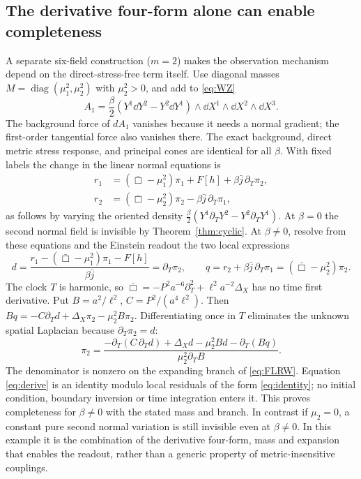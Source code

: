 \subsection{The derivative four-form alone can enable completeness}
A separate six-field construction (\(m=2\)) makes the observation mechanism depend on the direct-stress-free term itself. Use diagonal masses \(M=\operatorname{diag}(\mu_1^2,\mu_2^2)\) with \(\mu_2^2>0\), and add to \eqref{eq:WZ}
\begin{equation}\label{eq:gyroscopic}
 A_1=\frac{\beta}{2}(Y^1\dd Y^2-Y^2\dd Y^1)\wedge
                      \dd X^1\wedge\dd X^2\wedge\dd X^3 .
\end{equation}
The background force of \(dA_1\) vanishes because it needs a normal gradient; the first-order tangential force also vanishes there. The exact background, direct metric stress response, and principal cones are identical for all \(\beta\). With fixed labels the change in the linear normal equations is
\[
 \begin{split}
 r_1&=(\bar\Box-\mu_1^2)\pi_1+F[h]+\beta\bar j\,\partial_T\pi_2,\\
 r_2&=(\bar\Box-\mu_2^2)\pi_2-\beta\bar j\,\partial_T\pi_1 ,
 \end{split}
\]
as follows by varying the oriented density
\(\tfrac\beta2(Y^1\partial_TY^2-Y^2\partial_TY^1)\).
At \(\beta=0\) the second normal field is invisible by Theorem~\ref{thm:cyclic}. At \(\beta\ne0\), resolve from these equations and the Einstein readout the two local expressions
\[
 d=\frac{r_1-(\bar\Box-\mu_1^2)\pi_1-F[h]}{\beta\bar j}
       =\partial_T\pi_2,\qquad
 q=r_2+\beta\bar j\,\partial_T\pi_1=(\bar\Box-\mu_2^2)\pi_2 .
\]
The clock \(T\) is harmonic, so
\(\bar\Box=-P^2 a^{-6}\partial_T^2+\ell^2a^{-2}\Delta_X\)
has no time first derivative. Put \(B=a^2/\ell^2\), \(C=P^2/(a^4\ell^2)\). Then \(Bq=-C\partial_T d+\Delta_X\pi_2-\mu_2^2 B\pi_2\). Differentiating once in \(T\) eliminates the unknown spatial Laplacian because \(\partial_T\pi_2=d\):
\begin{equation}\label{eq:derive}
 \pi_2=\frac{-\partial_T(C\,\partial_Td)+\Delta_Xd
                   -\mu_2^2Bd-\partial_T(Bq)}
                 {\mu_2^2\partial_TB}.
\end{equation}
The denominator is nonzero on the expanding branch of \eqref{eq:FLRW}. Equation \eqref{eq:derive} is an identity modulo local residuals of the form \eqref{eq:identity}; no initial condition, boundary inversion or time integration enters it. This proves completeness for \(\beta\ne0\) with the stated mass and branch. In contrast if \(\mu_2=0\), a constant pure second normal variation is still invisible even at \(\beta\ne0\). In this example it is the combination of the derivative four-form, mass and expansion that enables the readout, rather than a generic property of metric-insensitive couplings.
